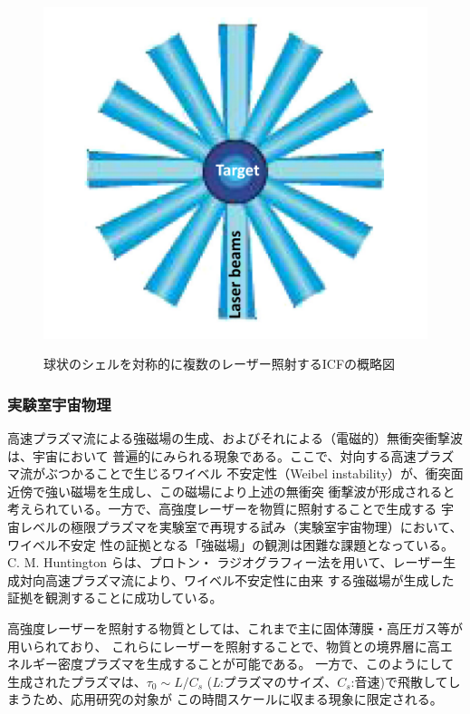 \documentclass[a4paper,11pt,titlepage]{jarticle}
\numberwithin{equation}{section} %
\begin{document}
\begin{figure}[H]
  \begin{center}
    \includegraphics[scale=0.4]{./image/1-2-2.png}
    \label{fig:1-2-2}
    \caption{球状のシェルを対称的に複数のレーザー照射するICFの概略図\cite{NIF}}
  \end{center}
\end{figure}

\subsubsection{実験室宇宙物理}
高速プラズマ流による強磁場の生成、およびそれによる（電磁的）無衝突衝撃波は、宇宙において
普遍的にみられる現象である。ここで、対向する高速プラズマ流がぶつかることで生じるワイベル
不安定性（Weibel instability）が、衝突面近傍で強い磁場を生成し、この磁場により上述の無衝突
衝撃波が形成されると考えられている。一方で、高強度レーザーを物質に照射することで生成する
宇宙レベルの極限プラズマを実験室で再現する試み（実験室宇宙物理）において、ワイベル不安定
性の証拠となる「強磁場」の観測は困難な課題となっている。C. M. Huntington らは、プロトン・
ラジオグラフィー法を用いて、レーザー生成対向高速プラズマ流により、ワイベル不安定性に由来
する強磁場が生成した証拠を観測することに成功している。\cite{28}




高強度レーザーを照射する物質としては、これまで主に固体薄膜・高圧ガス等が用いられており、
これらにレーザーを照射することで、物質との境界層に高エネルギー密度プラズマを生成することが可能である。
一方で、このようにして生成されたプラズマは、$\tau_0 \sim L/C_s$
(\textit{L}:プラズマのサイズ、$C_s$:音速)で飛散してしまうため、応用研究の対象が
この時間スケールに収まる現象に限定される。
\end{document}

